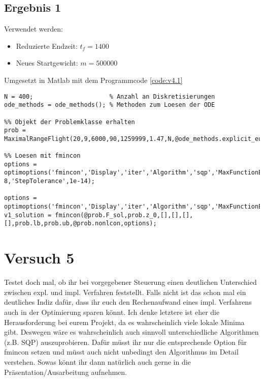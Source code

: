 \subsection{Ergebnis 1}
Verwendet werden:
\begin{itemize}
\item Reduzierte Endzeit: $t_f = 1400$
\item Neues Startgewicht: $m = 500000$
\end{itemize}
Umgesetzt in Matlab mit dem Programmcode \ref{code:v4.1}
\begin{lstlisting}[style=num_octave, caption={Matlab Programmcode für Versuch 3.}, label=code:v4.1]
N = 400;                     % Anzahl an Diskretisierungen
ode_methods = ode_methods(); % Methoden zum Loesen der ODE

%% Objekt der Problemklasse erhalten
prob = MaximalRangeFlight(20,9,6000,90,1259999,1.47,N,@ode_methods.explicit_euler);

%% Loesen mit fmincon
options = optimoptions('fmincon','Display','iter','Algorithm','sqp','MaxFunctionEvaluations',4000.0e+03,'MaxIterations',4.0e+05,'ConstraintTolerance',1e-8,'StepTolerance',1e-14);

options = optimoptions('fmincon','Display','iter','Algorithm','sqp','MaxFunctionEvaluations',1.000e+03,'MaxIterations',4.0e+05);
v1_solution = fmincon(@prob.F_sol,prob.z_0,[],[],[],[],prob.lb,prob.ub,@prob.nonlcon,options);
\end{lstlisting}
 











\newpage
\section{Versuch 5}
Testet doch mal, ob ihr bei vorgegebener Steuerung einen deutlichen Unterschied zwischen expl. und impl. Verfahren feststellt. Falls nicht ist das schon mal ein deutliches Indiz dafür, dass ihr euch den Rechenaufwand eines impl. Verfahrens auch in der Optimierung sparen könnt. Ich denke letztere ist eher die Herausforderung bei eurem Projekt, da es wahrscheinlich viele lokale Minima gibt. Deswegen wäre es wahrscheinlich auch sinnvoll unterschiedliche Algorithmen (z.B. SQP) auszuprobieren. Dafür müsst ihr nur die entsprechende Option für fmincon setzen und müsst auch nicht unbedingt den Algorithmus im Detail verstehen. Sowas könnt ihr dann natürlich auch gerne in die Präsentation/Ausarbeitung aufnehmen.







